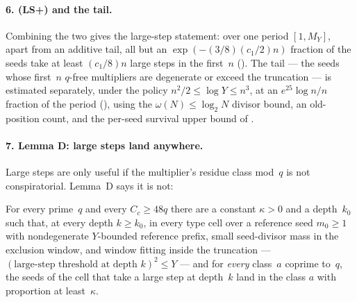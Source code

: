 \paragraph{6.  (LS+) and the tail.}
Combining the two gives the large-step statement: over one period
$[1,M_Y]$, apart from an additive tail, all but an
$\exp(-(3/8)(c_1/2)n)$ fraction of the seeds take at least $(c_1/8)n$ large
steps in the first~$n$
().  The tail --- the seeds whose
first~$n$ $q$-free multipliers are degenerate or exceed the truncation ---
is estimated separately, under the policy $n^2/2 \le \log Y \le n^3$, at an
$e^{25}\log n / n$ fraction of the period
(), using the
$\omega(N) \le \log_2 N$ divisor bound, an old-position count, and the
per-seed survival upper bound of
.

\paragraph{7.  Lemma D: large steps land anywhere.}
Large steps are only useful if the multiplier's residue class mod~$q$ is
not conspiratorial.  Lemma~D says it is not:

\begin{theorem}
\label{thm:lemma-D}
For every prime~$q$ and every $C_c \geq 48q$ there are a constant
$\kappa > 0$ and a depth~$k_0$ such that, at every depth $k \ge k_0$, in
every type cell over a reference seed $m_0 \ge 1$ with nondegenerate
$Y$-bounded reference prefix, small seed-divisor mass in the exclusion
window, and window fitting inside the truncation --- $(\text{large-step
threshold at depth } k)^2 \le Y$ --- and for \emph{every} class~$a$
coprime to~$q$, the seeds of the cell that take a large step at depth~$k$
land in the class $a$ with proportion at least~$\kappa$.
\end{theorem}

